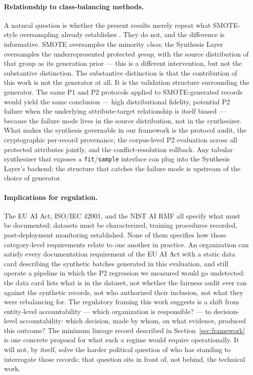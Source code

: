 \documentclass[11pt]{article}
\begin{document}
\paragraph{Relationship to class-balancing methods.} A natural question is whether the present results merely repeat what SMOTE-style oversampling already establishes \cite{Chawla2002SMOTE}. They do not, and the difference is informative. SMOTE oversamples the minority \emph{class}; the Synthesis Layer oversamples the underrepresented protected \emph{group}, with the source distribution of that group as its generation prior --- this is a different intervention, but not the substantive distinction. The substantive distinction is that the contribution of this work is not the generator at all. It is the validation structure surrounding the generator. The same P1 and P2 protocols applied to SMOTE-generated records would yield the same conclusion --- high distributional fidelity, potential P2 failure when the underlying attribute-target relationship is itself biased --- because the failure mode lives in the source distribution, not in the synthesizer. What makes the synthesis governable in our framework is the protocol audit, the cryptographic per-record provenance, the corpus-level P2 evaluation across all protected attributes jointly, and the conflict-resolution rollback. Any tabular synthesizer that exposes a \texttt{fit}/\texttt{sample} interface can plug into the Synthesis Layer's backend; the structure that catches the failure mode is upstream of the choice of generator.

\paragraph{Implications for regulation.} The EU AI Act, ISO/IEC 42001, and the NIST AI RMF all specify what must be documented: datasets must be characterized, training procedures recorded, post-deployment monitoring established. None of them specifies how those category-level requirements relate to one another in practice. An organization can satisfy every documentation requirement of the EU AI Act with a static data card describing the synthetic batches generated in this evaluation, and still operate a pipeline in which the P2 regression we measured would go undetected: the data card lists what is in the dataset, not whether the fairness audit ever ran against the synthetic records, not who authorized their inclusion, not what they were rebalancing for. The regulatory framing this work suggests is a shift from entity-level accountability --- which organization is responsible? --- to decision-level accountability: which decision, made by whom, on what evidence, produced this outcome? The minimum lineage record described in Section~\ref{sec:framework} is one concrete proposal for what such a regime would require operationally. It will not, by itself, solve the harder political question of who has standing to interrogate those records; that question sits in front of, not behind, the technical work.
\end{document}
